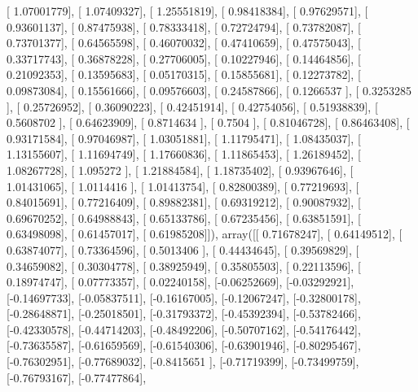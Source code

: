 \documentclass{article}
\begin{document}
       [ 1.07001779],
       [ 1.07409327],
       [ 1.25551819],
       [ 0.98418384],
       [ 0.97629571],
       [ 0.93601137],
       [ 0.87475938],
       [ 0.78333418],
       [ 0.72724794],
       [ 0.73782087],
       [ 0.73701377],
       [ 0.64565598],
       [ 0.46070032],
       [ 0.47410659],
       [ 0.47575043],
       [ 0.33717743],
       [ 0.36878228],
       [ 0.27706005],
       [ 0.10227946],
       [ 0.14464856],
       [ 0.21092353],
       [ 0.13595683],
       [ 0.05170315],
       [ 0.15855681],
       [ 0.12273782],
       [ 0.09873084],
       [ 0.15561666],
       [ 0.09576603],
       [ 0.24587866],
       [ 0.1266537 ],
       [ 0.3253285 ],
       [ 0.25726952],
       [ 0.36090223],
       [ 0.42451914],
       [ 0.42754056],
       [ 0.51938839],
       [ 0.5608702 ],
       [ 0.64623909],
       [ 0.8714634 ],
       [ 0.7504    ],
       [ 0.81046728],
       [ 0.86463408],
       [ 0.93171584],
       [ 0.97046987],
       [ 1.03051881],
       [ 1.11795471],
       [ 1.08435037],
       [ 1.13155607],
       [ 1.11694749],
       [ 1.17660836],
       [ 1.11865453],
       [ 1.26189452],
       [ 1.08267728],
       [ 1.095272  ],
       [ 1.21884584],
       [ 1.18735402],
       [ 0.93967646],
       [ 1.01431065],
       [ 1.0114416 ],
       [ 1.01413754],
       [ 0.82800389],
       [ 0.77219693],
       [ 0.84015691],
       [ 0.77216409],
       [ 0.89882381],
       [ 0.69319212],
       [ 0.90087932],
       [ 0.69670252],
       [ 0.64988843],
       [ 0.65133786],
       [ 0.67235456],
       [ 0.63851591],
       [ 0.63498098],
       [ 0.61457017],
       [ 0.61985208]]), array([[ 0.71678247],
       [ 0.64149512],
       [ 0.63874077],
       [ 0.73364596],
       [ 0.5013406 ],
       [ 0.44434645],
       [ 0.39569829],
       [ 0.34659082],
       [ 0.30304778],
       [ 0.38925949],
       [ 0.35805503],
       [ 0.22113596],
       [ 0.18974747],
       [ 0.07773357],
       [ 0.02240158],
       [-0.06252669],
       [-0.03292921],
       [-0.14697733],
       [-0.05837511],
       [-0.16167005],
       [-0.12067247],
       [-0.32800178],
       [-0.28648871],
       [-0.25018501],
       [-0.31793372],
       [-0.45392394],
       [-0.53782466],
       [-0.42330578],
       [-0.44714203],
       [-0.48492206],
       [-0.50707162],
       [-0.54176442],
       [-0.73635587],
       [-0.61659569],
       [-0.61540306],
       [-0.63901946],
       [-0.80295467],
       [-0.76302951],
       [-0.77689032],
       [-0.8415651 ],
       [-0.71719399],
       [-0.73499759],
       [-0.76793167],
       [-0.77477864],
\end{document}
